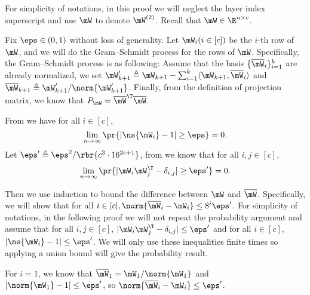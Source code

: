 \begin{proofof}{}
For simplicity of notations, in this proof we will neglect the layer index superscript and use $\mW$ to denote $\mW^{(2)}$. Recall that $\mW\in\R^{n\times c}$.

Fix $\eps\in(0,1)$ without loss of generality. Let $\mW_i(i\in[c])$ be the $i$-th row of $\mW$, and we will do the Gram–Schmidt process for the rows of $\mW$. Specifically, the Gram–Schmidt process is as following: Assume that the basis $\{\overline{\mW}_i\}_{i=1}^k$ are already normalized, we set $\mW_{k+1}'\triangleq \mW_{k+1} - \sum_{i=1}^k\langle \mW_{k+1}, \overline{\mW}_i\rangle$ and $\overline{\mW}_{k+1}\triangleq\mW_{k+1}'/\norm{\mW_{k+1}'}$. Finally, from the definition of projection matrix, we know that $P_\mW=\overline{\mW}^\T\overline{\mW}$.

From  we have for all $i\in[c]$,
\begin{equation}
    \lim_{n\to\infty}\pr{|\ns{\mW_i}-1|\geq\eps}=0.
\end{equation}
Let $\eps'\triangleq \eps^2/\rbr{c^3\cdot 16^{2c+1}}$, from  we know that for all $i,j\in[c]$, 
\begin{equation}
    \lim_{n\to\infty}\pr{|\mW_i\mW_j^\T-\delta_{i,j}|\geq\eps'}=0.
\end{equation}

Then we use induction to bound the difference between $\mW$ and $\overline{\mW}$. Specifically, we will show that for all $i\in[c], \norm{\overline{\mW}_i-\mW_i}\leq 8^{i}\eps'$. For simplicity of notations, in the following proof we will not repeat the probability argument and assume that for all $i,j\in[c]$, $|\mW_i\mW_j^\T-\delta_{i,j}|\leq\eps'$ and for all $i\in[c]$, $|\ns{\mW_i}-1|\leq\eps'$. We will only use these inequalities finite times so applying a union bound will give the probability result.

For $i=1$, we know that $\overline{\mW}_1 = \mW_1/\norm{\mW_1}$ and $|\norm{\mW_1}-1|\leq\eps'$, so $\norm{\overline{\mW}_i-\mW_i}\leq \eps'$.


\end{proofof}

